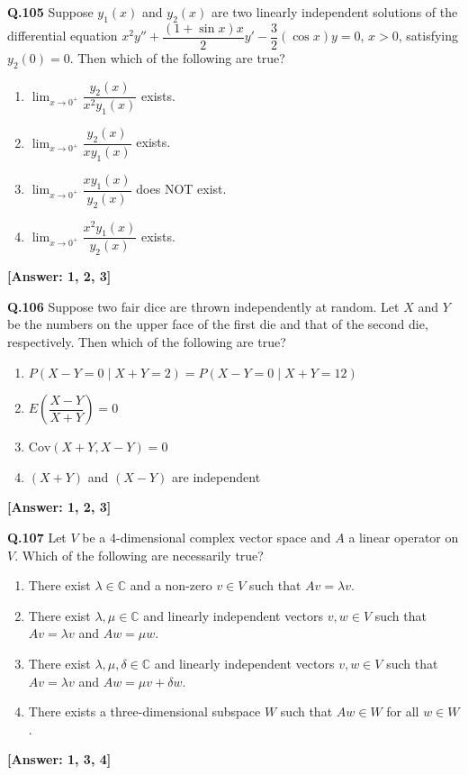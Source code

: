\documentclass[12pt,a4paper]{article}
\newcommand{\ans}[1]{\quad\textcolor{anscolor}{\textbf{[Answer: #1]}}}
\begin{document}
\textbf{Q.105} Suppose $y_1(x)$ and $y_2(x)$ are two linearly independent solutions of the differential equation $x^2y''+\dfrac{(1+\sin x)x}{2}y'-\dfrac{3}{2}(\cos x)y=0$, $x>0$, satisfying $y_2(0)=0$. Then which of the following are true?
\begin{enumerate}[label=\arabic*.]
\item $\lim_{x\to0^+}\dfrac{y_2(x)}{x^2y_1(x)}$ exists.
\item $\lim_{x\to0^+}\dfrac{y_2(x)}{xy_1(x)}$ exists.
\item $\lim_{x\to0^+}\dfrac{xy_1(x)}{y_2(x)}$ does NOT exist.
\item $\lim_{x\to0^+}\dfrac{x^2y_1(x)}{y_2(x)}$ exists.
\end{enumerate}\ans{1, 2, 3}

\textbf{Q.106} Suppose two fair dice are thrown independently at random. Let $X$ and $Y$ be the numbers on the upper face of the first die and that of the second die, respectively. Then which of the following are true?
\begin{enumerate}[label=\arabic*.]
\item $P(X-Y=0\mid X+Y=2)=P(X-Y=0\mid X+Y=12)$
\item $E\!\left(\dfrac{X-Y}{X+Y}\right)=0$
\item $\text{Cov}(X+Y,X-Y)=0$
\item $(X+Y)$ and $(X-Y)$ are independent
\end{enumerate}\ans{1, 2, 3}

\textbf{Q.107} Let $V$ be a 4-dimensional complex vector space and $A$ a linear operator on $V$. Which of the following are necessarily true?
\begin{enumerate}[label=\arabic*.]
\item There exist $\lambda\in\mathbb{C}$ and a non-zero $v\in V$ such that $Av=\lambda v$.
\item There exist $\lambda,\mu\in\mathbb{C}$ and linearly independent vectors $v,w\in V$ such that $Av=\lambda v$ and $Aw=\mu w$.
\item There exist $\lambda,\mu,\delta\in\mathbb{C}$ and linearly independent vectors $v,w\in V$ such that $Av=\lambda v$ and $Aw=\mu v+\delta w$.
\item There exists a three-dimensional subspace $W$ such that $Aw\in W$ for all $w\in W$.
\end{enumerate}\ans{1, 3, 4}
\end{document}
